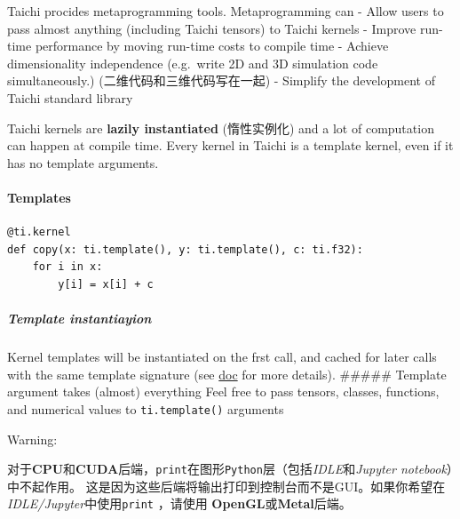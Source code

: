 \documentclass[11pt]{article}
\begin{document}
Taichi procides metaprogramming tools. Metaprogramming can - Allow users
to pass almost anything (including Taichi tensors) to Taichi kernels -
Improve run-time performance by moving run-time costs to compile time -
Achieve dimensionality independence (e.g.~write 2D and 3D simulation
code simultaneously.) (二维代码和三维代码写在一起) - Simplify the
development of Taichi standard library

Taichi kernels are \textbf{lazily instantiated} (惰性实例化) and a lot
of computation can happen at compile time. Every kernel in Taichi is a
template kernel, even if it has no template arguments.

    \hypertarget{templates}{%
\paragraph{Templates}\label{templates}}

\begin{verbatim}
@ti.kernel
def copy(x: ti.template(), y: ti.template(), c: ti.f32):
    for i in x:
        y[i] = x[i] + c
\end{verbatim}

\hypertarget{template-instantiayion}{%
\subparagraph{Template instantiayion}\label{template-instantiayion}}

Kernel templates will be instantiated on the frst call, and cached for
later calls with the same template signature (see
\href{https://taichi.readthedocs.io/en/latest/compilation.html}{doc} for
more details). \#\#\#\#\# Template argument takes (almost) everything
Feel free to pass tensors, classes, functions, and numerical values to
\texttt{ti.template()} arguments

    Warning:

对于\textbf{CPU}和\textbf{CUDA}后端，\texttt{print}在图形\texttt{Python}层（包括\emph{IDLE}和\emph{Jupyter
notebook}）中不起作用。
这是因为这些后端将输出打印到控制台而不是GUI。如果你希望在\emph{IDLE/Jupyter}中使用\texttt{print}
，请使用 \textbf{OpenGL}或\textbf{Metal}后端。
\end{document}
